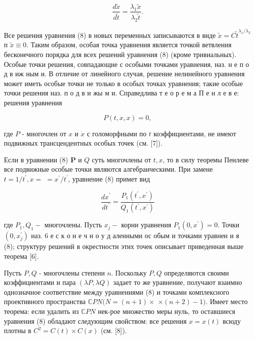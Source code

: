 \documentclass[10pt]{article}
\begin{document}
\[

\frac{d \tilde{x}}{d \tilde{t}}=\frac{\lambda_{1} \tilde{x}}{\lambda_{2} \tilde{t}} .

\]



Все решения уравнения (8) в новых переменных записываются в виде $\tilde{x}=C \tilde{t}^{\lambda_{1} / \lambda_{2}}$ п $\tilde{x} \equiv 0$. Таким образом, особая точка уравнения является точкой ветвления бесконечного порядка для всех решений уравнения (8) (кроме тривиальных). Особые точки решения, совпадающие с особыми точками уравнения, наз. н е п о д в иж ным и. В отличие от линейного случая, решение нелинейного уравнения может иметь особые точки не только в особых точках уравнения; такие особые точки решения наз. п о д в и жы м и. Справедлива т е о р е м а П е н л е в е: решения уравнения



\[

P(t, x, x)=0,

\]



где $P$ - многочлен от $x$ и $\dot{x}$ с голоморфными по $t$ коэффициентами, не имеют подвижных трансцендентных особых точек (см. [7]).



Если в уравнении (8) $\boldsymbol{P}$ и $Q$ суть многочлены от $t, x$, то в силу теоремы Пенлеве все подвижные особые точки являются алгебраическими. При замене $t=1 / t^{\prime}, x=$ $=x^{\prime} / t^{\prime}$, уравнение (8) примет вид



\[

\frac{d x^{\prime}}{d t^{\prime}}=\frac{P_{1}\left(t^{\prime}, x^{\prime}\right)}{Q_{1}\left(t^{\prime}, x^{\prime}\right)}

\]



где $P_{1}, Q_{1}-$ многочлены. Пусть $x_{j}-$ корни уравнения $P_{1}\left(0, x^{\prime}\right)=0$. Точки $\left(0, x_{j}^{\prime}\right)$ наз. 6 е с к о н е ч н о у д аленными ос обым и точками уравнен и я (8); структуру решений в окрестности этих точек описывает приведенная выше теорема [6].



Пусть $P, Q$ - многочлены степени $n$. Поскольку $P, Q$ определяются своими коэффициентами и пара $(\lambda P, \lambda Q)$ задает то же уравнение, получают взаимно однозначное соответствие между уравнениями (8) и точками комплексного проективного пространства $\mathbb{C} P N(N=(n+1) \times$ $\times(n+2)-1)$. Имеет место теорема: если удалить из $\mathbb{C} P N$ нек-рое множество меры нуль, то оставшиеся уравнения (8) обладают следующим свойством: все решения $x=x(t)$ всюду плотны в $C^{2}=C(t) \times C(x)$ (см. [8]).
\end{document}
